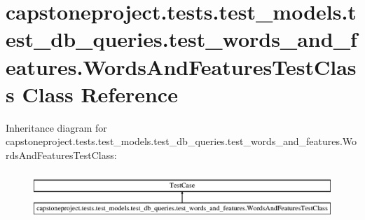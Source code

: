 \hypertarget{classcapstoneproject_1_1tests_1_1test__models_1_1test__db__queries_1_1test__words__and__featuresa2b06c902a13d9605b75d663fed77bb7}{}\section{capstoneproject.\+tests.\+test\+\_\+models.\+test\+\_\+db\+\_\+queries.\+test\+\_\+words\+\_\+and\+\_\+features.\+Words\+And\+Features\+Test\+Class Class Reference}
\label{classcapstoneproject_1_1tests_1_1test__models_1_1test__db__queries_1_1test__words__and__featuresa2b06c902a13d9605b75d663fed77bb7}
Inheritance diagram for capstoneproject.\+tests.\+test\+\_\+models.\+test\+\_\+db\+\_\+queries.\+test\+\_\+words\+\_\+and\+\_\+features.\+Words\+And\+Features\+Test\+Class\+:\begin{figure}[H]
\begin{center}
\leavevmode
\includegraphics[height=1.830065cm]{classcapstoneproject_1_1tests_1_1test__models_1_1test__db__queries_1_1test__words__and__featuresa2b06c902a13d9605b75d663fed77bb7}
\end{center}
\end{figure}
